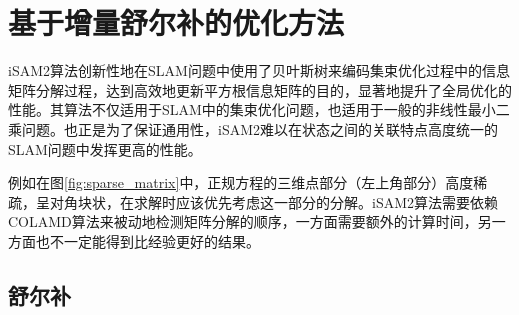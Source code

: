 \section{基于增量舒尔补的优化方法}

iSAM2算法\cite{kaess2008isam,kaess2012isam2}创新性地在SLAM问题中使用了贝叶斯树来编码集束优化过程中的信息矩阵分解过程，达到高效地更新平方根信息矩阵的目的，显著地提升了全局优化的性能。其算法不仅适用于SLAM中的集束优化问题，也适用于一般的非线性最小二乘问题。也正是为了保证通用性，iSAM2难以在状态之间的关联特点高度统一的SLAM问题中发挥更高的性能。

例如在图\ref{fig:sparse_matrix}中，正规方程的三维点部分（左上角部分）高度稀疏，呈对角块状，在求解时应该优先考虑这一部分的分解。iSAM2算法需要依赖COLAMD\citep{davis2004algorithm}算法来被动地检测矩阵分解的顺序，一方面需要额外的计算时间，另一方面也不一定能得到比经验更好的结果。

\subsection{舒尔补}

